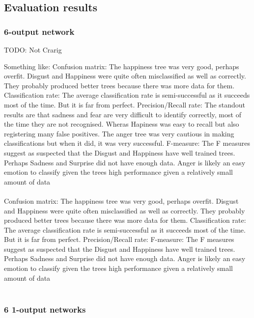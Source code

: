 \documentclass[12pt]{article}
\begin{document}
\subsection*{Evaluation results}

\subsubsection*{6-output network}

TODO: Not Crarig

Something like:
Confusion matrix: The happiness tree was very good, perhaps overfit. Disgust and Happiness were quite often misclassified as well as correctly. They probably produced better trees because there was more data for them. Classification rate: The average classification rate is semi-successful as it succeeds most of the time. But it is far from perfect. Precision/Recall rate: The standout results are that sadness and fear are very difficult to identify correctly, most of the time they are not recognised. Wheras Hapiness was easy to recall but also registering many false positives. The anger tree was very cautious in making classifications but when it did, it was very successful.  F-measure: The F measures suggest as suspected that the Disgust and Happiness have well trained trees. Perhaps Sadness and Surprise did not have enough data. Anger is likely an easy emotion to classify given the trees high performance given a relatively small amount of data \\ \\

Confusion matrix: The happiness tree was very good, perhaps overfit. Disgust and Happiness were quite often misclassified as well as correctly. They probably produced better trees because there was more data for them. Classification rate: The average classification rate is semi-successful as it succeeds most of the time. But it is far from perfect. Precision/Recall rate:  F-measure: The F measures suggest as suspected that the Disgust and Happiness have well trained trees. Perhaps Sadness and Surprise did not have enough data. Anger is likely an easy emotion to classify given the trees high performance given a relatively small amount of data \\ \\


\subsubsection*{6 1-output networks}
\end{document}
